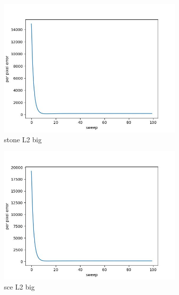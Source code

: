\documentclass[11pt]{article}
\begin{document}
\begin{figure}[ht!]
    \centering
    \hfill%
    \begin{subfigure}[]{0.333\linewidth}
        \centering
        \includegraphics[width=\linewidth]{fig/loss/stone_L2_big_loss.jpg}
        \caption{stone L2 big}
    \end{subfigure}%
    \hfill%
    \begin{subfigure}[]{0.333\linewidth}
        \centering
        \includegraphics[width=\linewidth]{fig/loss/sce_L2_big_loss.jpg}
        \caption{sce L2 big}
    \end{subfigure}%
    \hfill%
    \begin{subfigure}[]{0.333\linewidth}
        \centering

\end{subfigure}
\end{figure}
\end{document}
